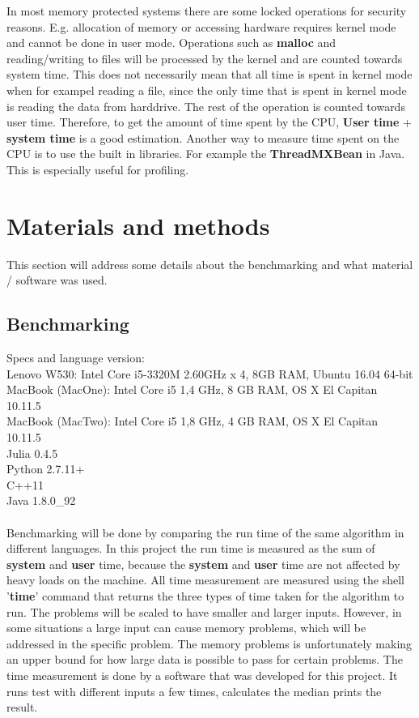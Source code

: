 \documentclass[a4paper, 11pt, titlepage]{article}
\begin{document}
In most memory protected systems there are some locked operations for security reasons. E.g. allocation of memory or accessing hardware requires kernel mode and cannot be done in user mode. Operations such as \textbf{malloc} and reading/writing to files will be processed by the kernel and are counted towards system time. This does not necessarily mean that all time is spent in kernel mode when for exampel reading a file, since the only time that is spent in kernel mode is reading the data from harddrive. The rest of the operation is counted towards user time. Therefore, to get the amount of time spent by the CPU, \textbf{User time} + \textbf{system time} is a good estimation. Another way to measure time spent on the CPU is to use the built in libraries. For example the \textbf{ThreadMXBean} in Java. This is especially useful for profiling.

\section{Materials and methods}
This section will address some details about the benchmarking and what material / software was used.
\subsection{Benchmarking}
Specs and language version: \\
Lenovo W530: Intel Core i5-3320M 2.60GHz x 4, 8GB RAM, Ubuntu 16.04 64-bit\\
MacBook (MacOne): Intel Core i5 1,4 GHz, 8 GB RAM, OS X El Capitan 10.11.5\\
MacBook (MacTwo): Intel Core i5 1,8 GHz, 4 GB RAM, OS X El Capitan 10.11.5\\
Julia 0.4.5 \\
Python 2.7.11+ \\
C++11 \\
Java 1.8.0\_92 \\\\
Benchmarking will be done by comparing the run time of the same algorithm in different languages. In this project the run time is measured as the sum of \textbf{system} and \textbf{user} time, because the \textbf{system} and \textbf{user} time are not affected by heavy loads on the machine. All time measurement are measured using the shell '\textbf{time}' command that returns the three types of time taken for the algorithm to run. The problems will be scaled to have smaller and larger inputs. However, in some situations a large input can cause memory problems, which will be addressed in the specific problem. The memory problems is unfortunately making an upper bound for how large data is possible to pass for certain problems. The time measurement is done by a software that was developed for this project. It runs test with different inputs a few times, calculates the median prints the result. 
\end{document}
